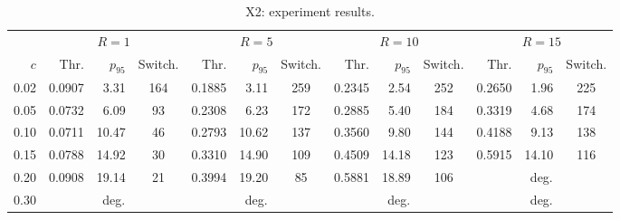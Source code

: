 \begin{table}[!htb]
  \centering
  \captionsetup{format=plain,justification=centering}
  \caption{X2: experiment results.}
  \label{tab:x2-grid}
  \small
  \setlength{\tabcolsep}{3.5pt}
  \begin{tabular}{r r r c r r c r r c r r c}
    \toprule
                                & \multicolumn{3}{c}{$R = 1$}  &
    \multicolumn{3}{c}{$R = 5$} & \multicolumn{3}{c}{$R = 10$} &
    \multicolumn{3}{c}{$R = 15$}
    \\
    \cmidrule(lr){2-4}\cmidrule(lr){5-7}\cmidrule(lr){8-10}\cmidrule(lr){11-13}
    $c$                         & Thr.                         & $p_{95}$ &
    Switch.                     & Thr.                         & $p_{95}$ &
    Switch.                     & Thr.                         & $p_{95}$ & Switch. & Thr. &
    $p_{95}$                    & Switch.
    \\
    \midrule
    0.02                        & 0.0907                       & 3.31     & 164
                                & 0.1885                       & 3.11     & 259
                                & 0.2345                       & 2.54     & 252
                                & 0.2650                       & 1.96     & 225              \\
    0.05                        & 0.0732                       & 6.09     & 93      &
    0.2308                      & 6.23                         & 172      &
    0.2885                      & 5.40                         & 184
                                & 0.3319                       & 4.68     & 174              \\
    0.10                        & 0.0711                       & 10.47    & 46      &
    0.2793                      & 10.62                        & 137      &
    0.3560                      & 9.80                         & 144
                                & 0.4188                       & 9.13     & 138              \\
    0.15                        & 0.0788                       & 14.92    & 30      &
    0.3310                      & 14.90                        & 109      &
    0.4509                      & 14.18                        & 123
                                & 0.5915                       & 14.10    & 116              \\
    0.20                        & 0.0908                       & 19.14    & 21      &
    0.3994                      & 19.20                        & 85       &
    0.5881                      & 18.89                        & 106
                                & \multicolumn{3}{c}{deg.}
    \\
    0.30                        & \multicolumn{3}{c}{deg.}     &
    \multicolumn{3}{c}{deg.}    & \multicolumn{3}{c}{deg.}     &
    \multicolumn{3}{c}{deg.}
    \\
    \bottomrule
  \end{tabular}
\end{table}

